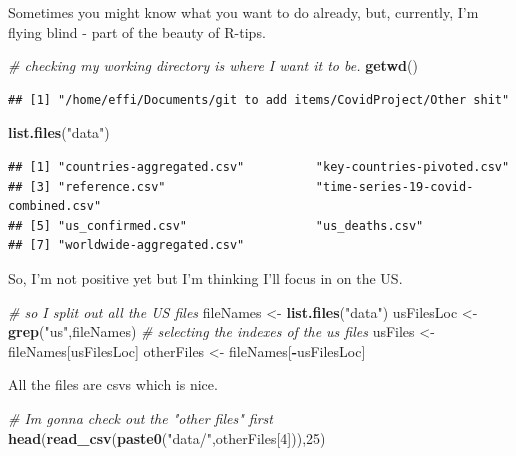 \documentclass[
]{article}
\newenvironment{Shaded}{\begin{snugshade}}{\end{snugshade}}
\newcommand{\CommentTok}[1]{\textcolor[rgb]{0.56,0.35,0.01}{\textit{#1}}}
\newcommand{\DecValTok}[1]{\textcolor[rgb]{0.00,0.00,0.81}{#1}}
\newcommand{\KeywordTok}[1]{\textcolor[rgb]{0.13,0.29,0.53}{\textbf{#1}}}
\newcommand{\NormalTok}[1]{#1}
\newcommand{\OperatorTok}[1]{\textcolor[rgb]{0.81,0.36,0.00}{\textbf{#1}}}
\newcommand{\StringTok}[1]{\textcolor[rgb]{0.31,0.60,0.02}{#1}}
\begin{document}
Sometimes you might know what you want to do already, but, currently,
I'm flying blind - part of the beauty of R-tips.

\begin{Shaded}
\begin{Highlighting}[]
\CommentTok{# checking my working directory is where I want it to be.}
\KeywordTok{getwd}\NormalTok{()}
\end{Highlighting}
\end{Shaded}

\begin{verbatim}
## [1] "/home/effi/Documents/git to add items/CovidProject/Other shit"
\end{verbatim}

\begin{Shaded}
\begin{Highlighting}[]
\KeywordTok{list.files}\NormalTok{(}\StringTok{"data"}\NormalTok{)}
\end{Highlighting}
\end{Shaded}

\begin{verbatim}
## [1] "countries-aggregated.csv"          "key-countries-pivoted.csv"        
## [3] "reference.csv"                     "time-series-19-covid-combined.csv"
## [5] "us_confirmed.csv"                  "us_deaths.csv"                    
## [7] "worldwide-aggregated.csv"
\end{verbatim}

So, I'm not positive yet but I'm thinking I'll focus in on the US.

\begin{Shaded}
\begin{Highlighting}[]
\CommentTok{# so I split out all the US files}
\NormalTok{fileNames <-}\StringTok{ }\KeywordTok{list.files}\NormalTok{(}\StringTok{"data"}\NormalTok{)}
\NormalTok{usFilesLoc <-}\StringTok{ }\KeywordTok{grep}\NormalTok{(}\StringTok{"us"}\NormalTok{,fileNames) }\CommentTok{# selecting the indexes of the us files}
\NormalTok{usFiles <-}\StringTok{ }\NormalTok{fileNames[usFilesLoc]}
\NormalTok{otherFiles <-}\StringTok{ }\NormalTok{fileNames[}\OperatorTok{-}\NormalTok{usFilesLoc]}
\end{Highlighting}
\end{Shaded}

All the files are csvs which is nice.

\begin{Shaded}
\begin{Highlighting}[]
\CommentTok{# Im gonna check out the "other files" first}
\KeywordTok{head}\NormalTok{(}\KeywordTok{read_csv}\NormalTok{(}\KeywordTok{paste0}\NormalTok{(}\StringTok{"data/"}\NormalTok{,otherFiles[}\DecValTok{4}\NormalTok{])),}\DecValTok{25}\NormalTok{)}
\end{Highlighting}
\end{Shaded}
\end{document}
